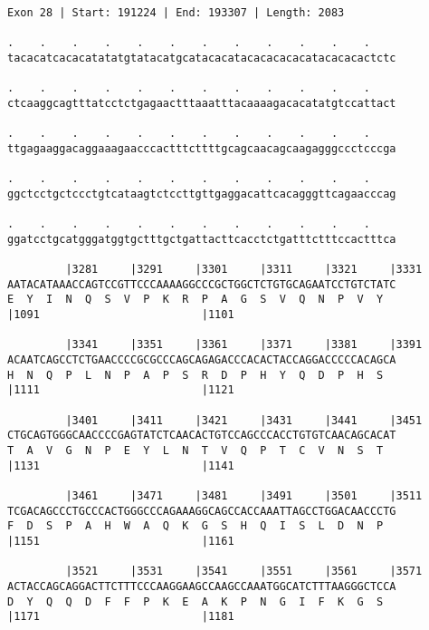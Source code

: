 \documentclass{article}
\begin{document}
\begin{Verbatim}
Exon 28 | Start: 191224 | End: 193307 | Length: 2083
 
.    .    .    .    .    .    .    .    .    .    .    .    
tacacatcacacatatatgtatacatgcatacacatacacacacacatacacacactctc
                                                            
.    .    .    .    .    .    .    .    .    .    .    .    
ctcaaggcagtttatcctctgagaactttaaatttacaaaagacacatatgtccattact
                                                            
.    .    .    .    .    .    .    .    .    .    .    .    
ttgagaaggacaggaaagaacccactttcttttgcagcaacagcaagagggccctcccga
                                                            
.    .    .    .    .    .    .    .    .    .    .    .    
ggctcctgctccctgtcataagtctccttgttgaggacattcacagggttcagaacccag
                                                            
.    .    .    .    .    .    .    .    .    .    .    .    
ggatcctgcatgggatggtgctttgctgattacttcacctctgatttctttccactttca
                                                            
         |3281     |3291     |3301     |3311     |3321     |3331
AATACATAAACCAGTCCGTTCCCAAAAGGCCCGCTGGCTCTGTGCAGAATCCTGTCTATC
E  Y  I  N  Q  S  V  P  K  R  P  A  G  S  V  Q  N  P  V  Y  
|1091                         |1101                         
  
         |3341     |3351     |3361     |3371     |3381     |3391
ACAATCAGCCTCTGAACCCCGCGCCCAGCAGAGACCCACACTACCAGGACCCCCACAGCA
H  N  Q  P  L  N  P  A  P  S  R  D  P  H  Y  Q  D  P  H  S  
|1111                         |1121                         
  
         |3401     |3411     |3421     |3431     |3441     |3451
CTGCAGTGGGCAACCCCGAGTATCTCAACACTGTCCAGCCCACCTGTGTCAACAGCACAT
T  A  V  G  N  P  E  Y  L  N  T  V  Q  P  T  C  V  N  S  T  
|1131                         |1141                         
  
         |3461     |3471     |3481     |3491     |3501     |3511
TCGACAGCCCTGCCCACTGGGCCCAGAAAGGCAGCCACCAAATTAGCCTGGACAACCCTG
F  D  S  P  A  H  W  A  Q  K  G  S  H  Q  I  S  L  D  N  P  
|1151                         |1161                         
  
         |3521     |3531     |3541     |3551     |3561     |3571
ACTACCAGCAGGACTTCTTTCCCAAGGAAGCCAAGCCAAATGGCATCTTTAAGGGCTCCA
D  Y  Q  Q  D  F  F  P  K  E  A  K  P  N  G  I  F  K  G  S  
|1171                         |1181                         
  

\end{Verbatim}
\end{document}
